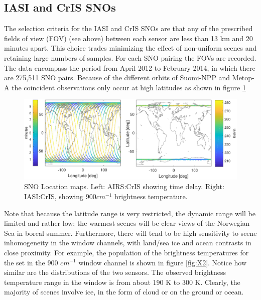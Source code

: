 \documentclass[twocolumn,10pt]{article}
\begin{document}
\subsection{IASI and CrIS SNOs}
\label{sec:orgheadline8}
The selection criteria for the IASI and CrIS SNOs are that any of the prescribed fields of view (FOV) (see above) between each sensor are less than 13 km and 20 minutes apart. This choice trades minimizing the effect of non-uniform scenes and retaining large numbers of samples.  For each SNO pairing the FOVs are recorded. The data encompass the period from April 2012 to February 2014, in which there are 275,511 SNO pairs. Because of the different orbits
of Suomi-NPP and Metop-A the coincident observations only occur at high latitudes as
shown in figure \ref{fig:X1}

\begin{figure}[htb]
\centering
\includegraphics[width=\linewidth]{./figs/AC_IC_jplSNO_maps.pdf}
\caption{\label{fig:orgparagraph3}
  SNO Location maps. Left: AIRS:CrIS showing time delay. Right: IASI:CrIS, showing $900 cm^{-1}$ brightness temperature.}
\label{fig:X1}
\end{figure}

Note that because the latitude range is very restricted, the dynamic range will be limited and rather low; the warmest scenes will be clear views of the Norwegian Sea in boreal summer.  Furthermore, there will tend to be high sensitivity to scene inhomogeneity in the window channels, with land/sea ice and ocean contrasts in close proximity. For example, the population of
the brightness temperatures for the set in the 900 $cm^{-1}$ window channel is shown in figure \ref{fig:X2}. Notice how similar are the distributions of the two sensors.
The observed brightness temperature range in the window is from about 190 K to 300 K. Clearly,
the majority of scenes involve ice, in the form of cloud or on the ground or ocean.
\end{document}
